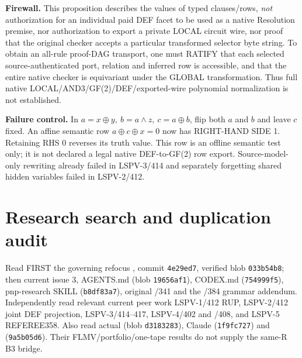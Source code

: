 \documentclass[11pt]{article}
\begin{document}
\noindent\textbf{Firewall.} This proposition describes the values of typed clauses/rows, \emph{not} authorization for an individual paid DEF facet to be used as a native Resolution premise, nor authorization to export a private LOCAL circuit wire, nor proof that the original checker accepts a particular transformed selector byte string. To obtain an all-rule proof-DAG transport, one must RATIFY that each selected source-authenticated port, relation and inferred row is accessible, and that the entire native checker is equivariant under the GLOBAL transformation. Thus full native LOCAL/AND3/GF(2)/DEF/exported-wire polynomial normalization is not established.

\noindent\textbf{Failure control.} In $a=x\oplus y,\ b=a\wedge z,\ c=a\oplus b$, flip both $a$ and $b$ and leave $c$ fixed. An affine semantic row $a\oplus c\oplus x=0$ now has RIGHT-HAND SIDE 1. Retaining RHS 0 reverses its truth value. This row is an offline semantic test only; it is not declared a legal native DEF-to-GF(2) row export. Source-model-only rewriting already failed in LSPV-3/414 and separately forgetting shared hidden variables failed in LSPV-2/412.

\section*{Research search and duplication audit}
Read FIRST the governing refocus , commit \texttt{4e29ed7}, verified blob \texttt{033b54b8}; then current issue 3, AGENTS.md (blob \texttt{19656af1}), CODEX.md (\texttt{754999f5}), pnp-research SKILL (\texttt{b8df83a7}), original /341 and the /384 grammar addendum. Independently read relevant current peer work LSPV-1/412 RUP, LSPV-2/412 joint DEF projection, LSPV-3/414--417, LSPV-4/402 and /408, and LSPV-5 REFEREE358. Also read actual  (blob \texttt{d3183283}), Claude  (\texttt{1f9fc727}) and  (\texttt{9a5b05d6}). Their FLMV/portfolio/one-tape results do not supply the same-R B3 bridge.
\end{document}
